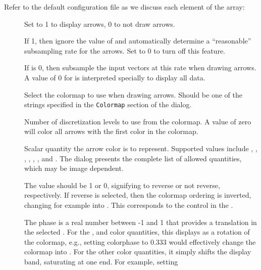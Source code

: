 Refer to the default configuration file as we discuss each element of
the  array:
\begin{description}
\item[]
  Set to 1 to display arrows, 0 to not draw arrows.
\item[]
 If 1, then ignore the value of  and
 automatically determine a ``reasonable'' subsampling rate for the
 arrows.  Set to 0 to turn off this feature.
\item[]
 If  is 0, then subsample the input vectors at this
 rate when drawing arrows.  A value of 0 for  is
 interpreted specially to display all data.
\item[]
  Select the colormap to use when drawing arrows.  Should be one of the
  strings specified in the {\tt Colormap} section of the
   dialog.
\item[]
  Number of discretization levels to use
  from the colormap.  A value of zero will color all arrows with the
  first color in the colormap.
\item[]
 Scalar quantity the arrow color is to represent.
 Supported values include , , , ,
 , , and .  The
  dialog presents the complete list of
 allowed quantities, which may be image dependent.
\item[]
 The  value should be 1 or 0, signifying to reverse or
 not reverse, respectively.  If reverse is selected, then the colormap
 ordering is inverted, changing for example  into
 .  This corresponds to the  control in
 the .
\item[]
 The phase is a real number between -1 and 1 that provides a translation
 in the selected .  For the , 
 and  color quantities, this displays as a rotation of the
 colormap, e.g., setting colorphase to 0.333 would effectively
 change the  colormap into
 .  For the other color quantities, it simply
 shifts the display band, saturating at one end.  For example, setting

\end{description}

